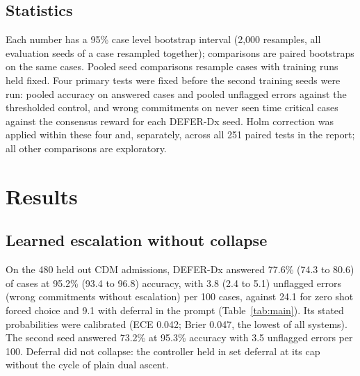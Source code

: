 \documentclass[11pt]{article}
\begin{document}
\subsection*{Statistics}
Each number has a 95\% case level bootstrap interval (2,000 resamples, all evaluation seeds of a case resampled together); comparisons are paired bootstraps on the same cases. Pooled seed comparisons resample cases with training runs held fixed. Four primary tests were fixed before the second training seeds were run: pooled accuracy on answered cases and pooled unflagged errors against the thresholded control, and wrong commitments on never seen time critical cases against the consensus reward for each DEFER-Dx seed. Holm correction was applied within these four and, separately, across all 251 paired tests in the report; all other comparisons are exploratory.

\section*{Results}

\subsection*{Learned escalation without collapse}
On the 480 held out CDM admissions, DEFER-Dx answered 77.6\% (74.3 to 80.6) of cases at 95.2\% (93.4 to 96.8) accuracy, with 3.8 (2.4 to 5.1) unflagged errors (wrong commitments without escalation) per 100 cases, against 24.1 for zero shot forced choice and 9.1 with deferral in the prompt (Table~\ref{tab:main}). Its stated probabilities were calibrated (ECE 0.042; Brier 0.047, the lowest of all systems). The second seed answered 73.2\% at 95.3\% accuracy with 3.5 unflagged errors per 100. Deferral did not collapse: the controller held in set deferral at its cap without the cycle of plain dual ascent.
\end{document}
